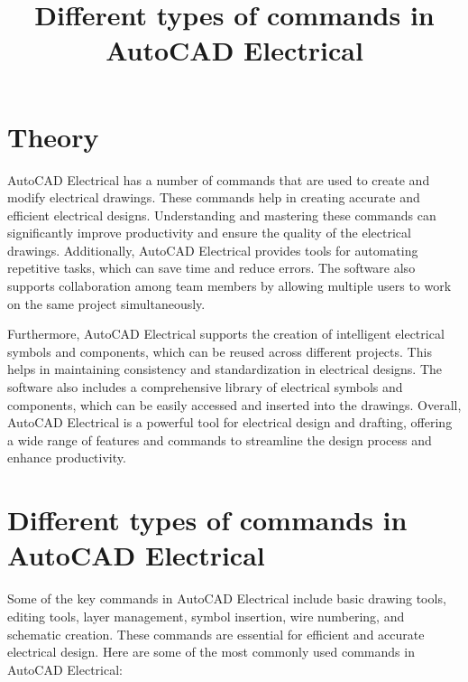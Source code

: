 \documentclass[12pt]{article}
\title{Different types of commands in AutoCAD Electrical}
\author{}
\date{}
\begin{document}


\pagebreak

\tableofcontents

\pagebreak
{}
\maketitle

\section*{Theory}
AutoCAD Electrical has a number of commands that are used to create and modify electrical drawings. These commands help in creating accurate and efficient electrical designs. Understanding and mastering these commands can significantly improve productivity and ensure the quality of the electrical drawings. Additionally, AutoCAD Electrical provides tools for automating repetitive tasks, which can save time and reduce errors. The software also supports collaboration among team members by allowing multiple users to work on the same project simultaneously.

Furthermore, AutoCAD Electrical supports the creation of intelligent electrical symbols and components, which can be reused across different projects. This helps in maintaining consistency and standardization in electrical designs. The software also includes a comprehensive library of electrical symbols and components, which can be easily accessed and inserted into the drawings. Overall, AutoCAD Electrical is a powerful tool for electrical design and drafting, offering a wide range of features and commands to streamline the design process and enhance productivity.

\section*{Different types of commands in AutoCAD Electrical}
Some of the key commands in AutoCAD Electrical include basic drawing tools, editing tools, layer management, symbol insertion, wire numbering, and schematic creation. These commands are essential for efficient and accurate electrical design. Here are some of the most commonly used commands in AutoCAD Electrical:
\end{document}
